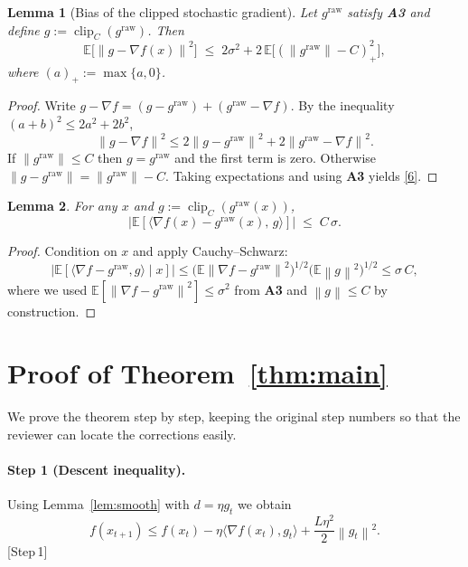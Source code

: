 \documentclass{article}
\newtheorem{lemma}{Lemma}
\newcommand{\norm}[1]{\left\lVert#1\right\rVert}
\newcommand{\E}{\mathbb{E}}
\begin{document}
\begin{lemma}[Bias of the clipped stochastic gradient]\label{lem:bias}
Let $g^{\text{raw}}$ satisfy \textbf{A3} and define $g:=\operatorname{clip}_{C}(g^{\text{raw}})$.
Then
\[
\E\!\bigl[\norm{g-\nabla f(x)}^{2}\bigr]
\;\le\;
2\sigma^{2}+2\,\E\!\bigl[(\norm{g^{\text{raw}}}-C)_{+}^{2}\bigr],
\tag{6}
\]
where $(a)_{+}:=\max\{a,0\}$.
\end{lemma}
\begin{proof}
Write $g-\nabla f=(g-g^{\text{raw}})+(g^{\text{raw}}-\nabla f)$.  By the inequality
$(a+b)^{2}\le2a^{2}+2b^{2}$,
\[
\norm{g-\nabla f}^{2}
\le 2\norm{g-g^{\text{raw}}}^{2}+2\norm{g^{\text{raw}}-\nabla f}^{2}.
\]
If $\norm{g^{\text{raw}}}\le C$ then $g=g^{\text{raw}}$ and the first term is zero.
Otherwise $\norm{g-g^{\text{raw}}}= \norm{g^{\text{raw}}}-C$.
Taking expectations and using \textbf{A3} yields \eqref{6}.
\end{proof}

\begin{lemma}\label{lem:mixed}
For any $x$ and $g:=\operatorname{clip}_{C}(g^{\text{raw}}(x))$,
\[
\bigl|\E[\langle\nabla f(x)-g^{\text{raw}}(x),\,g\rangle]\bigr|
\;\le\; C\,\sigma .
\tag{7}
\]
\end{lemma}
\begin{proof}
Condition on $x$ and apply Cauchy–Schwarz:
\[
\bigl|\E[\langle\nabla f-g^{\text{raw}},g\rangle\mid x]\bigr|
\le \bigl(\E\norm{\nabla f-g^{\text{raw}}}^{2}\bigr)^{1/2}
      \bigl(\E\norm{g}^{2}\bigr)^{1/2}
\le \sigma\,C,
\]
where we used $\E[\norm{\nabla f-g^{\text{raw}}}^{2}]\le\sigma^{2}$ from \textbf{A3}
and $\norm{g}\le C$ by construction.
\end{proof}

\section*{Proof of Theorem~\ref{thm:main}}
We prove the theorem step by step, keeping the original step numbers
so that the reviewer can locate the corrections easily.

\paragraph{Step 1 (Descent inequality).}
Using Lemma~\ref{lem:smooth} with $d=\eta g_{t}$ we obtain
\[
f(x_{t+1})\le
f(x_{t})-\eta\langle\nabla f(x_{t}),g_{t}\rangle
+\frac{L\eta^{2}}{2}\norm{g_{t}}^{2}.
\tag{8}
\]
[Step 1]
\end{document}
